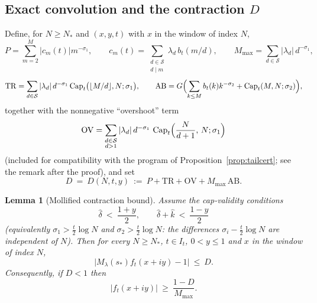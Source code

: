 \documentclass[11pt]{article}
\newtheorem{lemma}[theorem]{Lemma}
\theoremstyle{definition}
\newcommand{\calS}{\mathcal{S}}
\newcommand{\CapT}{\operatorname{Cap}}
\begin{document}
\subsection{Exact convolution and the contraction $D$}

Define, for $N\ge N_*$ and $(x,y,t)$ with $x$ in the window of index
$N$,
\[
P=\sum_{m=2}^{M}|c_m(t)|m^{-\sigma_1},
\qquad
c_m(t)=\sum_{\substack{d\in\calS\\ d\mid m}}\lambda_d\,b_t(m/d),
\qquad
M_{\max}=\sum_{d\in\calS}|\lambda_d|\,d^{-\sigma_1},
\]
\[
\mathrm{TR}=\sum_{d\in\calS}|\lambda_d|\,d^{-\sigma_1}
\CapT_t\bigl(\lfloor M/d\rfloor,N;\sigma_1\bigr),
\qquad
\mathrm{AB}=G\Bigl(\sum_{k\le M}b_t(k)k^{-\sigma_2}
+\CapT_t(M,N;\sigma_2)\Bigr),
\]
together with the nonnegative ``overshoot'' term
\[
\mathrm{OV}=\sum_{\substack{d\in\calS\\ d>1}}
|\lambda_d|\,d^{-\sigma_1}\,
\CapT_t\Bigl(\frac{N}{d+1},\,N;\sigma_1\Bigr)
\]
(included for compatibility with the program of
Proposition~\ref{prop:tailcert}; see the remark after the proof),
and set
\begin{equation}\label{eq:D}
D\ =\ D(N,t,y)\ :=\ P+\mathrm{TR}+\mathrm{OV}+M_{\max}\,\mathrm{AB}.
\end{equation}

\begin{lemma}[Mollified contraction bound]\label{lem:contraction}
Assume the cap-validity conditions
\begin{equation}\label{eq:capvalid}
\widehat\delta\ <\ \frac{1+y}2,
\qquad
\widehat\delta+\widehat k\ <\ \frac{1-y}2
\end{equation}
(equivalently $\sigma_1>\frac t2\log N$ and
$\sigma_2>\frac t2\log N$: the differences
$\sigma_i-\frac t2\log N$ are independent of $N$). Then for every
$N\ge N_*$, $t\in I_t$, $0<y\le1$ and $x$ in the window of index
$N$,
\[
\bigl|M_\lambda(s_*)f_t(x+iy)-1\bigr|\ \le\ D .
\]
Consequently, if $D<1$ then
\begin{equation}\label{eq:flowlower}
|f_t(x+iy)|\ \ge\ \frac{1-D}{M_{\max}} .
\end{equation}
\end{lemma}
\end{document}
